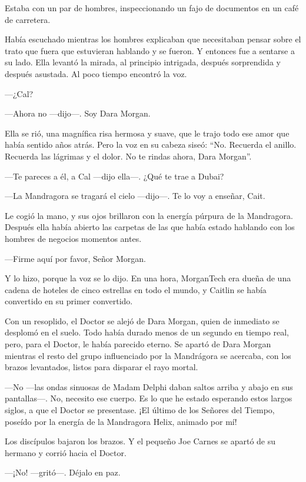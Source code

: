 Estaba con un par de hombres, inspeccionando un fajo de documentos en un
café de carretera.

Había escuchado mientras los hombres explicaban que necesitaban pensar
sobre el trato que fuera que estuvieran hablando y se fueron. Y entonces
fue a sentarse a su lado. Ella levantó la mirada, al principio
intrigada, después sorprendida y después asustada. Al poco tiempo
encontró la voz.

---¿Cal?

---Ahora no ---dijo---. Soy Dara Morgan.

Ella se rió, una magnífica risa hermosa y suave, que le trajo todo ese
amor que había sentido años atrás. Pero la voz en su cabeza siseó: ``No.
Recuerda el anillo. Recuerda las lágrimas y el dolor. No te rindas
ahora, Dara Morgan''.

---Te pareces a él, a Cal ---dijo ella---. ¿Qué te trae a Dubai?

---La Mandragora se tragará el cielo ---dijo---. Te lo voy a enseñar,
Cait.

Le cogió la mano, y sus ojos brillaron con la energía púrpura de la
Mandragora. Después ella había abierto las carpetas de las que había
estado hablando con los hombres de negocios momentos antes.

---Firme aquí por favor, Señor Morgan.

Y lo hizo, porque la voz se lo dijo. En una hora, MorganTech era dueña
de una cadena de hoteles de cinco estrellas en todo el mundo, y Caitlin
se había convertido en su primer convertido.

Con un resoplido, el Doctor se alejó de Dara Morgan, quien de inmediato
se desplomó en el suelo. Todo había durado menos de un segundo en tiempo
real, pero, para el Doctor, le había parecido eterno. Se apartó de Dara
Morgan mientras el resto del grupo influenciado por la Mandrágora se
acercaba, con los brazos levantados, listos para disparar el rayo
mortal.

---No ---las ondas sinuosas de Madam Delphi daban saltos arriba y abajo
en sus pantallas---. No, necesito ese cuerpo. Es lo que he estado
esperando estos largos siglos, a que el Doctor se presentase. ¡El último
de los Señores del Tiempo, poseído por la energía de la Mandragora
Helix, animado por mí!

Los discípulos bajaron los brazos. Y el pequeño Joe Carnes se apartó de
su hermano y corrió hacia el Doctor.

---¡No! ---gritó---. Déjalo en paz.

